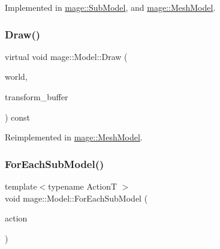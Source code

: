 Implemented in \hyperlink{classmage_1_1_sub_model_a368bcc2ee819cc29ec0203e314ae91d3}{mage\+::\+Sub\+Model}, and \hyperlink{classmage_1_1_mesh_model_a7130eca9a1dac038c33b838c15138161}{mage\+::\+Mesh\+Model}.

\hypertarget{classmage_1_1_model_a0252d4e8ce355600347962c994531a88}{}\label{classmage_1_1_model_a0252d4e8ce355600347962c994531a88} 
\subsubsection{\texorpdfstring{Draw()}{Draw()}}
{\footnotesize\ttfamily virtual void mage\+::\+Model\+::\+Draw (\begin{DoxyParamCaption}\item[{const \hyperlink{classmage_1_1_world}{World} \&}]{world,  }\item[{const \hyperlink{structmage_1_1_transform_buffer}{Transform\+Buffer} \&}]{transform\+\_\+buffer }\end{DoxyParamCaption}) const\hspace{0.3cm}{\ttfamily [virtual]}}



Reimplemented in \hyperlink{classmage_1_1_mesh_model_a3e0f9f6d78e00f264d4611f809961c8a}{mage\+::\+Mesh\+Model}.

\hypertarget{classmage_1_1_model_a65e9485c22d93506c4ce58836aba931b}{}\label{classmage_1_1_model_a65e9485c22d93506c4ce58836aba931b} 
\subsubsection{\texorpdfstring{For\+Each\+Sub\+Model()}{ForEachSubModel()}\hspace{0.1cm}{\footnotesize\ttfamily [1/2]}}
{\footnotesize\ttfamily template$<$typename ActionT $>$ \\
void mage\+::\+Model\+::\+For\+Each\+Sub\+Model (\begin{DoxyParamCaption}\item[{ActionT}]{action }\end{DoxyParamCaption})}

\hypertarget{classmage_1_1_model_ab50233128bb52002a11f3195b846c830}{}\label{classmage_1_1_model_ab50233128bb52002a11f3195b846c830} 

